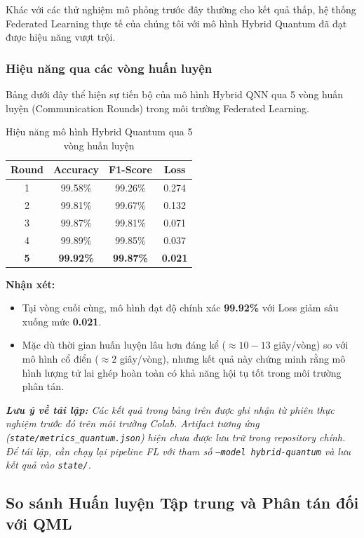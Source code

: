 Khác với các thử nghiệm mô phỏng trước đây thường cho kết quả thấp, hệ thống Federated Learning thực tế của chúng tôi với mô hình Hybrid Quantum đã đạt được hiệu năng vượt trội.

\subsubsection{Hiệu năng qua các vòng huấn luyện}
Bảng dưới đây thể hiện sự tiến bộ của mô hình Hybrid QNN qua 5 vòng huấn luyện (Communication Rounds) trong môi trường Federated Learning.

\begin{table}[ht!]
\centering
\caption{Hiệu năng mô hình Hybrid Quantum qua 5 vòng huấn luyện}
\label{tab:quantum_progress}
\begin{tabular}{|c|c|c|c|}
\hline
\textbf{Round} & \textbf{Accuracy} & \textbf{F1-Score} & \textbf{Loss} \\ \hline
1 & 99.58\% & 99.26\% & 0.274 \\ \hline
2 & 99.81\% & 99.67\% & 0.132 \\ \hline
3 & 99.87\% & 99.81\% & 0.071 \\ \hline
4 & 99.89\% & 99.85\% & 0.037 \\ \hline
\textbf{5} & \textbf{99.92\%} & \textbf{99.87\%} & \textbf{0.021} \\ \hline
\end{tabular}
\end{table}

\textbf{Nhận xét:}
\begin{itemize}
    \item Tại vòng cuối cùng, mô hình đạt độ chính xác \textbf{99.92\%} với Loss giảm sâu xuống mức \textbf{0.021}.
    \item Mặc dù thời gian huấn luyện lâu hơn đáng kể ($\approx 10 - 13$ giây/vòng) so với mô hình cổ điển ($\approx 2$ giây/vòng), nhưng kết quả này chứng minh rằng mô hình lượng tử lai ghép hoàn toàn có khả năng hội tụ tốt trong môi trường phân tán.
\end{itemize}

\textit{\textbf{Lưu ý về tái lập:} Các kết quả trong bảng trên được ghi nhận từ phiên thực nghiệm trước đó trên môi trường Colab. Artifact tương ứng (\texttt{state/metrics\_quantum.json}) hiện chưa được lưu trữ trong repository chính. Để tái lập, cần chạy lại pipeline FL với tham số \texttt{--model hybrid-quantum} và lưu kết quả vào \texttt{state/}.}

\subsection{So sánh Huấn luyện Tập trung và Phân tán đối với QML}


